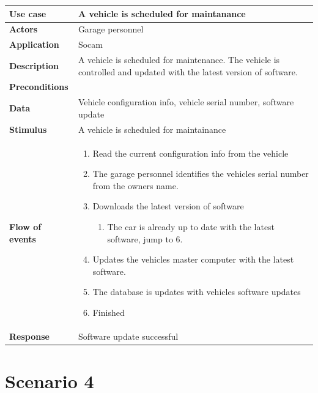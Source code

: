 		\begin{table}[H]
		\begin{tabular}{ p{4cm} | p{10cm} }
			\hline
			\rowcolor{gray}
			{\bf Use case} & {\bf A vehicle is scheduled for maintanance} \\ \hline
			{\bf Actors} & Garage personnel\\ \hline
			{\bf Application} & Socam \\ \hline
			{\bf Description} & A vehicle is scheduled for maintenance. The vehicle 
			is controlled and updated with the latest version of software. \\ \hline
			{\bf Preconditions} & \\ \hline
			{\bf Data} & Vehicle configuration info, vehicle serial number, software update \\ \hline
			{\bf Stimulus} & A vehicle is scheduled for maintainance \\ \hline
			{\bf Flow of events} & 
				\begin{enumerate}[font=\bfseries]
					\item Read the current configuration info from the vehicle
					\item The garage personnel identifies the vehicles serial 
					number from the owners name.
					\item Downloads the latest version of software 
						\begin{enumerate}[label*=\arabic*., font=\bfseries]
							\item The car is already up to date with the latest software, jump to 6.
						\end{enumerate}
					\item Updates the vehicles master computer with the latest software.
					\item The database is updates with vehicles software updates
					\item Finished
				\end{enumerate}
			
			\\ \hline
			{\bf Response} & Software update successful  \\ \hline

		\end{tabular}
	\end{table}


\clearpage
\section{Scenario 4}

